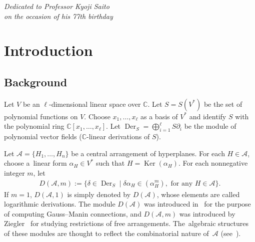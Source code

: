 \documentclass[pdftex]{sigma}
\numberwithin{equation}{section}
\newcommand{\A}{\mathcal{A}}
\newcommand{\C}{\mathbb{C}}
\newcommand{\Der}{\operatorname{Der}}
\newcommand{\Ker}{\operatorname{Ker}}
\begin{document}

\begin{flushright}
\begin{minipage}{60mm}
\it
Dedicated to Professor Kyoji Saito\\ on the occasion of his 77th birthday
\end{minipage}
\end{flushright}

\renewcommand{\thefootnote}{\arabic{footnote}}
\setcounter{footnote}{0}

\section{Introduction}

\subsection{Background}%

Let $V$ be an $\ell$-dimensional linear space over $\C$.
Let $S=S(V^*)$ be the set of polynomial functions on $V$.
Choose $x_1, \dots, x_\ell$ as a basis of $V^*$ and identify $S$ with the
polynomial ring $\C[x_1, \dots, x_\ell]$.
Let $\Der_S=\bigoplus_{i=1}^\ell S\partial_i$ be the module of polynomial
vector fields ($\C$-linear derivations of $S$).

Let $\A=\{H_1, \dots, H_n\}$ be a central arrangement of hyperplanes.
For each $H\in\A$, choose a~linear form $\alpha_H\in V^*$ such that
$H=\Ker(\alpha_H)$.
For each nonnegative integer $m$, let
\begin{gather*}
D(\A, m):=\big\{\delta\in\Der_S\mid \delta\alpha_H\in(\alpha_H^m),
\mbox{ for any }H\in\A\big\}.
\end{gather*}
If $m=1$, $D(\A, 1)$ is simply denoted by $D(\A)$, whose elements are
called logarithmic derivations. The module $D(\A)$ was
introduced in~\cite{sai-log} for the purpose of computing Gauss--Manin
connections, and $D(\A, m)$ was introduced by Ziegler~\cite{zie} for studying
restrictions of free arrangements.
The~alge\-b\-raic structures of these modules are thought to reflect
the combinatorial nature of~$\A$ (see~\cite{ot, yos-survey}).
\end{document}
